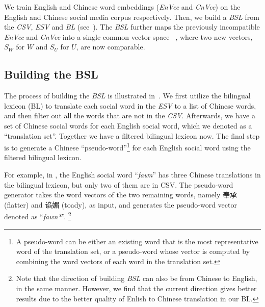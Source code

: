 We train English and 
Chinese word embeddings (\textit{EnVec} and \textit{CnVec}) 
on the English and Chinese social media corpus respectively. 
Then, 
we build a \textit{BSL}
from the \textit{CSV}, \textit{ESV} and \textit{BL} (see~). 
The \textit{BSL} further maps the previously incompatible \textit{EnVec} and \textit{CnVec} 
into a single common vector space \textit{\socvec~},
where two new vectors, $S_W$ for $W$ and $S_U$ for $U$,
are now comparable.
%

\subsection{Building the {BSL}}
\label{sec:bsl}
The process of building the \textit{BSL} is 
illustrated in~. 
We first utilize the bilingual lexicon (BL) to translate each social word 
in the \textit{ESV} to a list of Chinese words, and then filter out all the words 
that are not in the \textit{CSV}. 
Afterwards, we have a set of 
Chinese social words for each English social word, which we denoted as a ``translation set''. Together we have a filtered bilingual lexicon now.
The final step is to generate a Chinese ``pseudo-word''\footnote{A pseudo-word can be either 
	an existing word that is the most representative word of the translation set, or a pseudo-word whose vector is computed by combining the word vectors of
	each word in the translation set.}
for each English social word using the filtered bilingual lexicon.

For example, in , the
English social word ``\textit{fawn}'' has three Chinese translations in the 
bilingual lexicon, but only two of them are in CSV. 
The pseudo-word generator takes the word vectors of the two remaining words, namely
奉承 (flatter) and 谄媚 (toady), as input, and generates the pseudo-word 
vector denoted as ``\textit{fawn*}''. \footnote{Note that the direction of building \textit{BSL} can also be from Chinese to English, 
	in the same manner. However, we find that the current direction 
		gives better results due to the better quality of Enlish to Chinese translation in our BL.}

